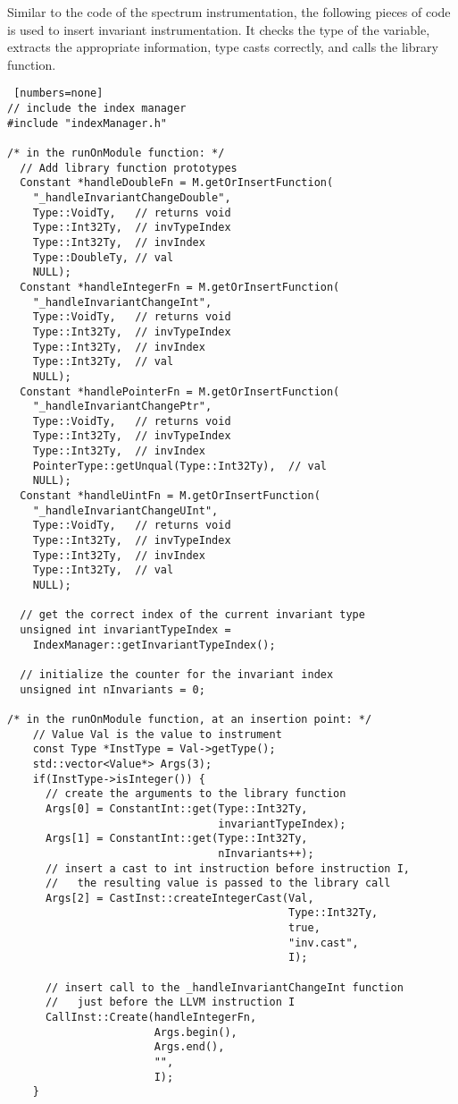 Similar to the code of the spectrum instrumentation,
the following pieces of code is used to insert invariant
instrumentation.
It checks the type of the variable,
extracts the appropriate information, type casts correctly,
and calls the library function.
\begin{lstlisting} [numbers=none]
// include the index manager
#include "indexManager.h"

/* in the runOnModule function: */
  // Add library function prototypes
  Constant *handleDoubleFn = M.getOrInsertFunction(
    "_handleInvariantChangeDouble", 
    Type::VoidTy,   // returns void
    Type::Int32Ty,  // invTypeIndex
    Type::Int32Ty,  // invIndex
    Type::DoubleTy, // val
    NULL);
  Constant *handleIntegerFn = M.getOrInsertFunction(
    "_handleInvariantChangeInt", 
    Type::VoidTy,   // returns void
    Type::Int32Ty,  // invTypeIndex
    Type::Int32Ty,  // invIndex
    Type::Int32Ty,  // val
    NULL);
  Constant *handlePointerFn = M.getOrInsertFunction(
    "_handleInvariantChangePtr", 
    Type::VoidTy,   // returns void
    Type::Int32Ty,  // invTypeIndex
    Type::Int32Ty,  // invIndex
    PointerType::getUnqual(Type::Int32Ty),  // val
    NULL);
  Constant *handleUintFn = M.getOrInsertFunction(
    "_handleInvariantChangeUInt", 
    Type::VoidTy,   // returns void
    Type::Int32Ty,  // invTypeIndex
    Type::Int32Ty,  // invIndex
    Type::Int32Ty,  // val
    NULL);

  // get the correct index of the current invariant type
  unsigned int invariantTypeIndex = 
    IndexManager::getInvariantTypeIndex();

  // initialize the counter for the invariant index
  unsigned int nInvariants = 0;

/* in the runOnModule function, at an insertion point: */
    // Value Val is the value to instrument
    const Type *InstType = Val->getType();
    std::vector<Value*> Args(3);
    if(InstType->isInteger()) {
      // create the arguments to the library function
      Args[0] = ConstantInt::get(Type::Int32Ty, 
                                 invariantTypeIndex);
      Args[1] = ConstantInt::get(Type::Int32Ty, 
                                 nInvariants++);
      // insert a cast to int instruction before instruction I,
      //   the resulting value is passed to the library call
      Args[2] = CastInst::createIntegerCast(Val, 
                                            Type::Int32Ty, 
                                            true, 
                                            "inv.cast", 
                                            I);

      // insert call to the _handleInvariantChangeInt function
      //   just before the LLVM instruction I
      CallInst::Create(handleIntegerFn, 
                       Args.begin(), 
                       Args.end(), 
                       "", 
                       I);
    }
\end{lstlisting}


